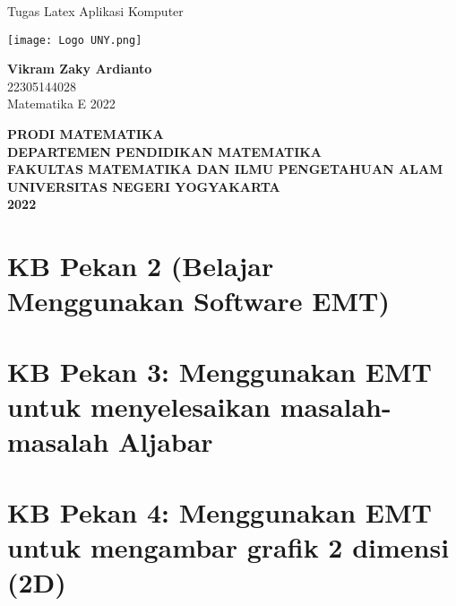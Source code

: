 \documentclass{report}
\begin{document}
\begin{titlepage}
    \begin{center}
        \vspace*{1cm}
        
        \vspace{0.5cm}
        
        \LARGE
        Tugas Latex Aplikasi Komputer  
        
        \vspace{1cm}
        
        \texttt{[image: Logo UNY.png]}

        \vspace{1cm}
        
        \textbf{Vikram Zaky Ardianto}\\
        22305144028\\
        Matematika E 2022
        
        \vspace{2cm}
        
        \Large
        \textbf{PRODI MATEMATIKA}\\
        \textbf{DEPARTEMEN PENDIDIKAN MATEMATIKA}\\
        \textbf{FAKULTAS MATEMATIKA DAN ILMU PENGETAHUAN ALAM}
        \textbf{UNIVERSITAS NEGERI YOGYAKARTA}\\
        \textbf{2022}
        
    \end{center}
\end{titlepage}

\newpage
\tableofcontents

\chapter{KB Pekan 2 (Belajar Menggunakan Software EMT)}


\newpage
\chapter{KB Pekan 3: Menggunakan EMT untuk menyelesaikan masalah-masalah Aljabar}


\newpage
\chapter{KB Pekan 4: Menggunakan EMT untuk mengambar grafik 2 dimensi (2D)}

\end{document}

